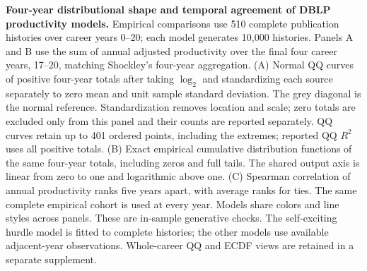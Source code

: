 \textbf{Four-year distributional shape and temporal agreement of DBLP productivity models.} Empirical comparisons use 510 complete publication histories over career years 0--20; each model generates 10,000 histories. Panels A and B use the sum of annual adjusted productivity over the final four career years, 17--20, matching Shockley's four-year aggregation. (A) Normal QQ curves of positive four-year totals after taking $\log_2$ and standardizing each source separately to zero mean and unit sample standard deviation. The grey diagonal is the normal reference. Standardization removes location and scale; zero totals are excluded only from this panel and their counts are reported separately. QQ curves retain up to 401 ordered points, including the extremes; reported QQ $R^2$ uses all positive totals. (B) Exact empirical cumulative distribution functions of the same four-year totals, including zeros and full tails. The shared output axis is linear from zero to one and logarithmic above one. (C) Spearman correlation of annual productivity ranks five years apart, with average ranks for ties. The same complete empirical cohort is used at every year. Models share colors and line styles across panels. These are in-sample generative checks. The self-exciting hurdle model is fitted to complete histories; the other models use available adjacent-year observations. Whole-career QQ and ECDF views are retained in a separate supplement.
